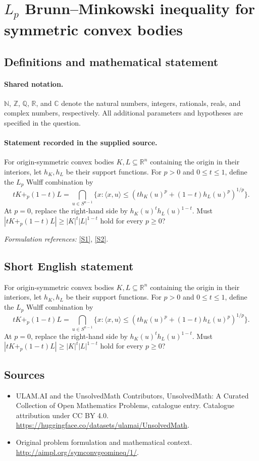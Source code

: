 \documentclass[11pt]{article}
\newcommand{\sref}[2]{\hyperlink{source:#1:#2}{[S#2]}}
\begin{document}
\section{\texorpdfstring{$L_p$ Brunn–Minkowski inequality for symmetric convex bodies}{L\_p Brunn–Minkowski inequality for symmetric convex bodies}}\label{statement}

\subsection{Definitions and mathematical statement}

\paragraph{Shared notation.}$\mathbb N$, $\mathbb Z$, $\mathbb Q$, $\mathbb R$, and $\mathbb C$ denote the natural numbers, integers, rationals, reals, and complex numbers, respectively. All additional parameters and hypotheses are specified in the question.


\paragraph{Statement recorded in the supplied source.}
For origin-symmetric convex bodies $K,L\subseteq\mathbb R^n$ containing the origin in their interiors, let $h_K,h_L$ be their support functions. For $p>0$ and $0\leq t\leq1$, define the $L_p$ Wulff combination by
\[tK+_p(1-t)L=\bigcap_{u\in S^{n-1}}\{x:\langle x,u\rangle\leq(th_K(u)^p+(1-t)h_L(u)^p)^{1/p}\}.\]
At $p=0$, replace the right-hand side by $h_K(u)^th_L(u)^{1-t}$. Must $|tK+_p(1-t)L|\geq|K|^t|L|^{1-t}$ hold for every $p\geq0$?
\par\smallskip\textit{Formulation references:} \sref{statement}{1}, \sref{statement}{2}.
\subsection{Short English statement}
For origin-symmetric convex bodies $K,L\subseteq\mathbb R^n$ containing the origin in their interiors, let $h_K,h_L$ be their support functions. For $p>0$ and $0\leq t\leq1$, define the $L_p$ Wulff combination by
\[tK+_p(1-t)L=\bigcap_{u\in S^{n-1}}\{x:\langle x,u\rangle\leq(th_K(u)^p+(1-t)h_L(u)^p)^{1/p}\}.\]
At $p=0$, replace the right-hand side by $h_K(u)^th_L(u)^{1-t}$. Must $|tK+_p(1-t)L|\geq|K|^t|L|^{1-t}$ hold for every $p\geq0$?
\subsection{Sources}
\begin{itemize}
\item[\hypertarget{source:statement:1}{S1}] ULAM.AI and the UnsolvedMath Contributors, UnsolvedMath: A Curated Collection of Open Mathematics Problems, catalogue entry. Catalogue attribution under CC BY 4.0.
\url{https://huggingface.co/datasets/ulamai/UnsolvedMath}.
\item[\hypertarget{source:statement:2}{S2}] Original problem formulation and mathematical context.
\url{http://aimpl.org/symconvgeomineq/1/}.
\end{itemize}
\label{end:statement}
\end{document}
